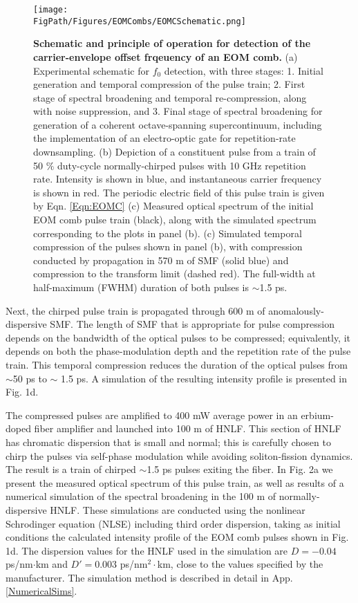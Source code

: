 \begin{figure}[htpb]
	\begin{center}
		\texttt{[image: \\FigPath/Figures/EOMCombs/EOMCSchematic.png]}
	\end{center}
	\caption[Figure Title]{\textbf{Schematic and principle of operation for detection of the carrier-envelope offset frqeuency of an EOM comb.} (a) Experimental schematic for $f_0$ detection, with three stages: 1. Initial generation and temporal compression of the pulse train; 2. First stage of spectral broadening and temporal re-compression, along with noise suppression, and 3. Final stage of spectral broadening for generation of a coherent octave-spanning supercontinuum, including the implementation of an electro-optic gate for repetition-rate downsampling. (b) Depiction of a constituent pulse from a train of 50 $\%$ duty-cycle normally-chirped pulses with 10 GHz repetition rate. Intensity is shown in blue, and instantaneous carrier frequency is shown in red. The periodic electric field of this pulse train is given by Eqn. \ref{Eqn:EOMC} (c) Measured optical spectrum of the initial EOM comb pulse train (black), along with the simulated spectrum corresponding to the plots in panel (b). (c) Simulated temporal compression of the pulses shown in panel (b), with compression conducted by propagation in 570 m of SMF (solid blue) and compression to the transform limit (dashed red). The full-width at half-maximum (FWHM) duration of both pulses is $\sim$1.5 ps.   }
	\label{fig:EOMC_Schematic}
\end{figure} 


Next, the chirped pulse train is propagated through 600 m of anomalously-dispersive SMF. The length of SMF that is appropriate for pulse compression depends on the bandwidth of the optical pulses to be compressed; equivalently, it depends on both the phase-modulation depth and the repetition rate of the pulse train. This temporal compression reduces the duration of the optical pulses from $\sim$50 ps to $\sim$ 1.5 ps. A simulation of the resulting intensity profile is presented in Fig. 1d. 

The compressed pulses are amplified to 400 mW average power in an erbium-doped fiber amplifier and launched into 100 m of HNLF. This section of HNLF has chromatic dispersion that is small and normal; this is carefully chosen to chirp the pulses via self-phase modulation while avoiding soliton-fission dynamics\cite{Dudley2006}. The result is a train of chirped $\sim$1.5 ps pulses exiting the fiber.  In Fig. 2a we present the measured optical spectrum of this pulse train, as well as results of a numerical simulation of the spectral broadening in the 100 m of normally-dispersive HNLF. These simulations are conducted using the nonlinear Schrodinger equation (NLSE) including third order dispersion\cite{Agrawal2007}, taking as initial conditions the calculated intensity profile of the EOM comb pulses shown in Fig. 1d. The dispersion values for the HNLF used in the simulation are $D=-0.04$  ps/nm$\cdot$km and $D'=0.003$ ps/nm$^2\cdot$km, close to the values specified by the manufacturer. The simulation method is described in detail in App. \ref{NumericalSims}.

